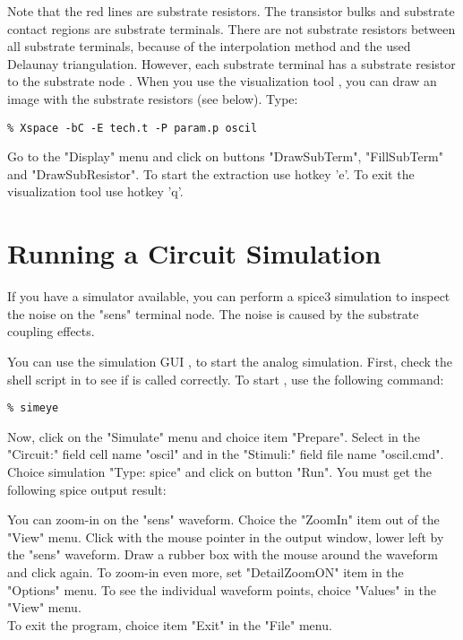 Note that the red lines are substrate resistors.
The transistor bulks and substrate contact regions are substrate terminals.
There are not substrate resistors between all substrate terminals,
because of the interpolation method and the used Delaunay triangulation.
However, each substrate terminal has a substrate resistor to the substrate node .
When you use the visualization tool ,
you can draw an image with the substrate resistors (see below).
Type:
\small
\begin{Verbatim}
% Xspace -bC -E tech.t -P param.p oscil
\end{Verbatim}
\normalsize
Go to the "Display" menu and click on buttons "DrawSubTerm", "FillSubTerm" and "DrawSubResistor".
To start the extraction use hotkey 'e'.
To exit the visualization tool use hotkey 'q'.
\begin{figure}[h]
\centerline{}
\end{figure}

\section{Running a Circuit Simulation}
If you have a  simulator available, you can perform a spice3
simulation to inspect the noise on the "sens" terminal node.
The noise is caused by the substrate coupling effects.


You can use the simulation GUI , to start the analog simulation.
First, check the shell script  in  to see
if  is called correctly.
To start , use the following command:
\small
\begin{Verbatim}
% simeye
\end{Verbatim}
\normalsize
Now, click on the "Simulate" menu and choice item "Prepare".
Select in the "Circuit:" field cell name "oscil" and
in the "Stimuli:" field file name "oscil.cmd".
Choice simulation "Type: spice" and click on button "Run".
You must get the following spice output result:

\begin{figure}[h]
\centerline{}
\end{figure}

You can zoom-in on the "sens" waveform.
Choice the "ZoomIn" item out of the "View" menu.
Click with the mouse pointer in the output window, lower left by the "sens" waveform.
Draw a rubber box with the mouse around the waveform and click again.
To zoom-in even more, set "DetailZoomON" item in the "Options" menu.
To see the individual waveform points, choice "Values" in the "View" menu.
\\[1 ex]
To exit the program, choice item "Exit" in the "File" menu.
\newpage
